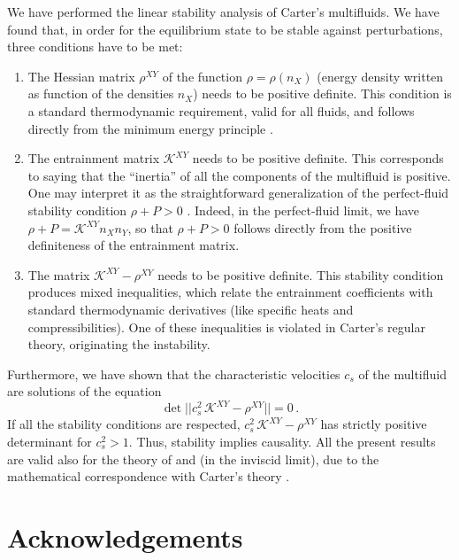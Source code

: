 \documentclass[a4paper, amsfonts, amssymb, amsmath, reprint, showkeys, nofootinbib, twoside, onecolumn,notitlepage]{revtex4-1}
\theoremstyle{definition}
\theoremstyle{theorem}
\begin{document}
We have performed the linear stability analysis of Carter's multifluids. We have found that, in order for the equilibrium state to be stable against perturbations, three conditions have to be met:
\begin{enumerate}
\item The Hessian matrix $\rho^{XY}$ of the function $\rho=\rho(n_X)$ (energy density written as function of the densities $n_X$) needs to be positive definite. This condition is a standard thermodynamic requirement, valid for all fluids, and follows directly from the minimum energy principle \cite{Callen_book}.
\item The entrainment matrix $\mathcal{K}^{XY}$ needs to be positive definite. This corresponds to saying that the ``inertia'' of all the components of the multifluid is positive. One may interpret it as the straightforward generalization of the perfect-fluid stability condition $\rho+P>0$ \cite{GavassinoCausality2021}. Indeed, in the perfect-fluid limit, we have $\rho +P = \mathcal{K}^{XY} n_X n_Y$, so that $\rho+P>0$ follows directly from the positive definiteness of the entrainment matrix.
\item The matrix $\mathcal{K}^{XY}-\rho^{XY}$ needs to be positive definite. This stability condition produces mixed inequalities, which relate the entrainment coefficients with standard thermodynamic derivatives (like specific heats and compressibilities). One of these inequalities is violated in Carter's regular theory, originating the instability.
\end{enumerate}
Furthermore, we have shown that the characteristic velocities $c_s$ of the multifluid are solutions of the equation 
\begin{equation}\label{gabibbo}
\det || c_s^2 \, \mathcal{K}^{XY} - \rho^{XY} ||=0 \, .
\end{equation}
If all the stability conditions are respected, $c_s^2 \, \mathcal{K}^{XY} - \rho^{XY}$ has strictly positive determinant for $c_s^2 >1$. Thus, stability implies causality. All the present results are valid also for the theory of \citet{Son2001} and \citet{Gusakov2007} (in the inviscid limit), due to the mathematical correspondence with Carter's theory \cite{Termo}. 





\section*{Acknowledgements}
\end{document}
